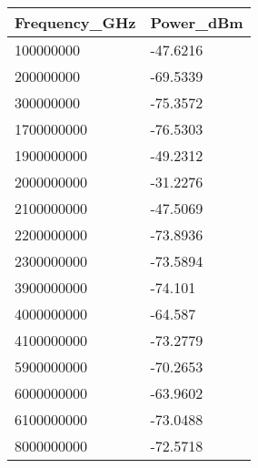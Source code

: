\begin{tabular}{ll}
Frequency_GHz & Power_dBm \\ 
\hline 
100000000 & -47.6216 \\ 
200000000 & -69.5339 \\ 
300000000 & -75.3572 \\ 
1700000000 & -76.5303 \\ 
1900000000 & -49.2312 \\ 
2000000000 & -31.2276 \\ 
2100000000 & -47.5069 \\ 
2200000000 & -73.8936 \\ 
2300000000 & -73.5894 \\ 
3900000000 & -74.101 \\ 
4000000000 & -64.587 \\ 
4100000000 & -73.2779 \\ 
5900000000 & -70.2653 \\ 
6000000000 & -63.9602 \\ 
6100000000 & -73.0488 \\ 
8000000000 & -72.5718 \\ 
\hline 
\end{tabular}